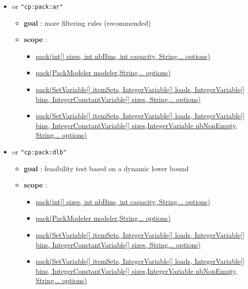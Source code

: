 \begin{itemize}
		\item \label{cpackar:cpackaroptions}\hypertarget{cpackar:cpackaroptions}{}		
		 or \texttt{"cp:pack:ar"}
		\begin{itemize}
				\item \textbf{goal} : more filtering rules (recommended)				
				\item \textbf{scope} : 
					\begin{itemize}
						\item \hyperlink{pack:packconstraint}{pack(int[] sizes, int nbBins, int capacity, String... options)}
						\item \hyperlink{pack:packconstraint}{pack(PackModeler modeler,String... options)}
						\item \hyperlink{pack:packconstraint}{pack(SetVariable[] itemSets, IntegerVariable[] loads, IntegerVariable[] bins, IntegerConstantVariable[] sizes, String... options)}
						\item \hyperlink{pack:packconstraint}{pack(SetVariable[] itemSets, IntegerVariable[] loads, IntegerVariable[] bins, IntegerConstantVariable[] sizes,IntegerVariable nbNonEmpty, String... options)}						
					\end{itemize}
		\end{itemize}
		\item \label{cpackdlb:cpackdlboptions}\hypertarget{cpackdlb:cpackdlboptions}{}		
		 or \texttt{"cp:pack:dlb"}
		\begin{itemize}
				\item \textbf{goal} : feasibility test based on a dynamic lower bound
				\item \textbf{scope} : 
					\begin{itemize}
						\item \hyperlink{pack:packconstraint}{pack(int[] sizes, int nbBins, int capacity, String... options)}
						\item \hyperlink{pack:packconstraint}{pack(PackModeler modeler,String... options)}
						\item \hyperlink{pack:packconstraint}{pack(SetVariable[] itemSets, IntegerVariable[] loads, IntegerVariable[] bins, IntegerConstantVariable[] sizes, String... options)}
						\item \hyperlink{pack:packconstraint}{pack(SetVariable[] itemSets, IntegerVariable[] loads, IntegerVariable[] bins, IntegerConstantVariable[] sizes,IntegerVariable nbNonEmpty, String... options)}						
					\end{itemize}

\end{itemize}
\end{itemize}
